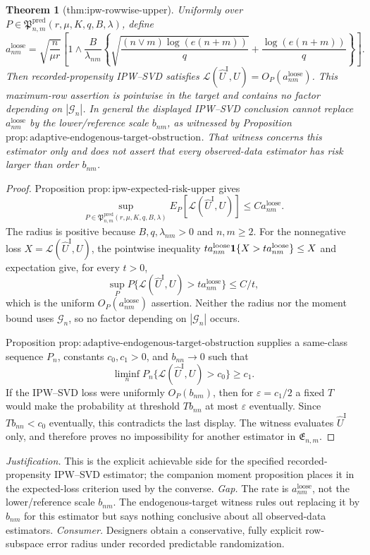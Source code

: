 \documentclass{article}
\newtheorem{theorem}{Theorem}
\begin{document}
\begin{theorem}[thm:ipw-rowwise-upper]\label{thm:ipw-rowwise-upper}
Uniformly over \(P\in\mathfrak P^{\mathrm{pred}}_{n,m}(r,\mu,K,q,B,\lambda)\), define
\[
 a^{\mathrm{loose}}_{nm}=
 \sqrt{\frac n{\mu r}}\left[1\wedge
 \frac B{\lambda_{nm}}\left\{
 \sqrt{\frac{(n\vee m)\log(e(n+m))}{q}}+
 \frac{\log(e(n+m))}{q}\right\}\right].
\]
Then recorded-propensity IPW--SVD satisfies
\(\mathcal L(\widehat U^{\mathrm I},U)=O_P(a^{\mathrm{loose}}_{nm})\).  This maximum-row assertion is pointwise in the target and contains no factor depending on \(|\mathcal G_n|\).  In general the displayed IPW--SVD conclusion cannot replace \(a^{\mathrm{loose}}_{nm}\) by the lower/reference scale \(b_{nm}\), as witnessed by Proposition \(\mathrm{prop:adaptive\mbox{-}endogenous\mbox{-}target\mbox{-}obstruction}\).  That witness concerns this estimator only and does not assert that every observed-data estimator has risk larger than order \(b_{nm}\).
\end{theorem}
\begin{proof}
Proposition \(\mathrm{prop:ipw\mbox{-}expected\mbox{-}risk\mbox{-}upper}\) gives
\[
 \sup_{P\in\mathfrak P^{\mathrm{pred}}_{n,m}(r,\mu,K,q,B,\lambda)}
 E_P\!\left[\mathcal L(\widehat U^{\mathrm I},U)\right]
 \le C a^{\mathrm{loose}}_{nm}.
\]
The radius is positive because \(B,q,\lambda_{nm}>0\) and \(n,m\ge2\).  For the nonnegative loss \(X=\mathcal L(\widehat U^{\mathrm I},U)\), the pointwise inequality \(t a^{\mathrm{loose}}_{nm}{\bf1}\{X>t a^{\mathrm{loose}}_{nm}\}\le X\) and expectation give, for every \(t>0\),
\[
 \sup_P P\{\mathcal L(\widehat U^{\mathrm I},U)>t a^{\mathrm{loose}}_{nm}\}
 \le C/t,
\]
which is the uniform \(O_P(a^{\mathrm{loose}}_{nm})\) assertion.  Neither the radius nor the moment bound uses \(\mathcal G_n\), so no factor depending on \(|\mathcal G_n|\) occurs.

Proposition \(\mathrm{prop:adaptive\mbox{-}endogenous\mbox{-}target\mbox{-}obstruction}\) supplies a same-class sequence \(P_n\), constants \(c_0,c_1>0\), and \(b_{nn}\to0\) such that
\[
 \liminf_nP_n\{\mathcal L(\widehat U^{\mathrm I},U)>c_0\}\ge c_1.
\]
If the IPW--SVD loss were uniformly \(O_P(b_{nm})\), then for \(\varepsilon=c_1/2\) a fixed \(T\) would make the probability at threshold \(Tb_{nn}\) at most \(\varepsilon\) eventually.  Since \(Tb_{nn}<c_0\) eventually, this contradicts the last display.  The witness evaluates \(\widehat U^{\mathrm I}\) only, and therefore proves no impossibility for another estimator in \(\mathfrak E_{n,m}\).
\end{proof}
\par\smallskip\noindent \textit{Justification.} This is the explicit achievable side for the specified recorded-propensity IPW--SVD estimator; the companion moment proposition places it in the expected-loss criterion used by the converse. \textit{Gap.} The rate is \(a^{\mathrm{loose}}_{nm}\), not the lower/reference scale \(b_{nm}\).  The endogenous-target witness rules out replacing it by \(b_{nm}\) for this estimator but says nothing conclusive about all observed-data estimators. \textit{Consumer.} Designers obtain a conservative, fully explicit row-subspace error radius under recorded predictable randomization.
\end{document}
